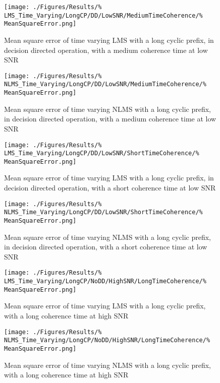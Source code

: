 \begin{figure}[ht]
	\centering
	\begin{minipage}{0.49\textwidth}
		\centering
		\texttt{[image: ./Figures/Results/\%
	LMS\_Time\_Varying/LongCP/DD/LowSNR/MediumTimeCoherence/\%
	MeanSquareError.png]}
		\captionsetup{width=0.75\linewidth}
		\caption{Mean square error of time varying LMS with a 
		long cyclic prefix, in decision directed operation, 
		with a medium coherence time at low SNR}
	\end{minipage}
	\begin{minipage}{0.49\textwidth}
		\centering
		\texttt{[image: ./Figures/Results/\%
	NLMS\_Time\_Varying/LongCP/DD/LowSNR/MediumTimeCoherence/\%
	MeanSquareError.png]}
		\captionsetup{width=0.75\linewidth}
		\caption{Mean square error of time varying NLMS with 
		a long cyclic prefix, in decision directed operation,
		with a medium coherence time at low SNR}
	\end{minipage}
\end{figure}

\begin{figure}[ht]
	\begin{minipage}{0.49\textwidth}
		\centering
		\texttt{[image: ./Figures/Results/\%
	LMS\_Time\_Varying/LongCP/DD/LowSNR/ShortTimeCoherence/\%
	MeanSquareError.png]}
		\captionsetup{width=0.75\linewidth}
		\caption{Mean square error of time varying LMS with a 
		long cyclic prefix, in decision directed operation,
		with a short coherence time at low SNR}
	\end{minipage}
	\begin{minipage}{0.49\textwidth}
		\texttt{[image: ./Figures/Results/\%
	NLMS\_Time\_Varying/LongCP/DD/LowSNR/ShortTimeCoherence/\%
	MeanSquareError.png]}
		\captionsetup{width=0.75\linewidth}
		\caption{Mean square error of time varying NLMS with 
		a long cyclic prefix, in decision directed operation,
		with a short coherence time at low SNR}
	\end{minipage}
\end{figure}

\begin{figure}[ht]
	\begin{minipage}{0.49\textwidth}
		\texttt{[image: ./Figures/Results/\%
	LMS\_Time\_Varying/LongCP/NoDD/HighSNR/LongTimeCoherence/\%
	MeanSquareError.png]}
		\captionsetup{width=0.75\linewidth}
		\caption{Mean square error of time varying LMS with a 
		long cyclic prefix, with a long coherence time at 
		high SNR}
	\end{minipage}
	\begin{minipage}{0.49\textwidth}
		\texttt{[image: ./Figures/Results/\%
	NLMS\_Time\_Varying/LongCP/NoDD/HighSNR/LongTimeCoherence/\%
	MeanSquareError.png]}
		\captionsetup{width=0.75\linewidth}
		\caption{Mean square error of time varying NLMS with 
		a long cyclic prefix, with a long coherence time at 
		high SNR}
	\end{minipage}
\end{figure}

